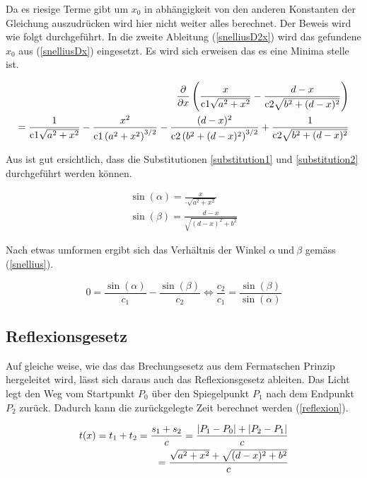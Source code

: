 Da es riesige Terme gibt um $x_0$ in abhängigkeit von den anderen Konstanten der Gleichung auszudrücken wird hier nicht weiter alles berechnet. Der Beweis wird wie folgt durchgeführt.
In die zweite Ableitung (\eqref{snelliusD2x}) wird das gefundene $x_0$ aus (\eqref{snelliusDx}) eingesetzt. Es wird sich erweisen das es eine Minima stelle ist.

\begin{align}
\frac{\partial}{\partial x}\left(\frac{x}{\text{c1} \sqrt{a^2+x^2}}-\frac{d-x}{\text{c2} \sqrt{b^2+(d-x)^2}}\right) \notag \\
=\frac{1}{\text{c1} \sqrt{a^2+x^2}}-\frac{x^2}{\text{c1} \left(a^2+x^2\right)^{3/2}}-\frac{(d-x)^2}{\text{c2} \left(b^2+(d-x)^2\right)^{3/2}}+\frac{1}{\text{c2} \sqrt{b^2+(d-x)^2}}
\label{snelliusD2x}
\end{align}

Aus  ist gut ersichtlich, dass die Substitutionen \ref{substitution1} und \ref{substitution2} durchgeführt werden können.

\begin{align}
	\sin(\alpha) = \frac{x}{\cdot \sqrt{a^2 + x^2}}  \label{substitution1}\\
	\sin(\beta) = \frac{d-x}{\sqrt{(d -x)^2 + b^2}} \label{substitution2}
\end{align}

Nach etwas umformen ergibt sich das Verhältnis der Winkel $\alpha \ \text{und} \ \beta$ gemäss (\eqref{snellius}).

\begin{equation}
	0 = \frac{\sin(\alpha)}{c_1} - \frac{\sin(\beta)}{c_2} \Leftrightarrow\frac{c_2}{c_1} = \frac{\sin(\beta)}{\sin(\alpha)}
	\label{snellius}
\end{equation}


\subsection{Reflexionsgesetz}
\cite{Wikipedia} Auf gleiche weise, wie das das Brechungsesetz aus dem Fermatschen Prinzip hergeleitet wird, 
lässt sich daraus auch das Reflexionsgesetz ableiten.
Das Licht legt den Weg vom Startpunkt $P_0$ über den Spiegelpunkt $P_1$ 
nach dem Endpunkt $P_2$ zurück. Dadurch kann die zurückgelegte Zeit berechnet werden (\eqref{reflexion}).


\begin{align}
t(x) = t_1 + t_2 = \frac{s_1 + s_2}{c} = \frac{|P_1 - P_0| + |P_2 - P_1|}{c} \notag \\
= \frac{\sqrt{a^2 + x^2} + \sqrt{(d-x)^2 + b^2}}{c} \label{reflexion}
\end{align}

